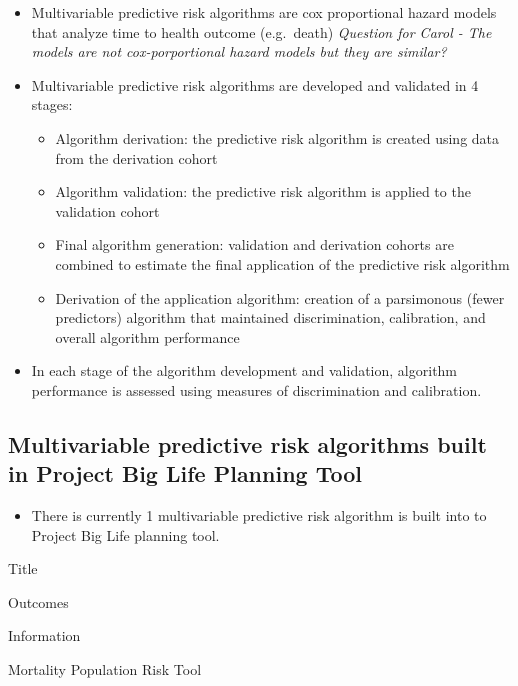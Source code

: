 \documentclass[]{book}
\providecommand{\tightlist}{%
  \setlength{\itemsep}{0pt}\setlength{\parskip}{0pt}}
\begin{document}
\begin{itemize}
\item
  Multivariable predictive risk algorithms are cox proportional hazard models that analyze time to health outcome (e.g.~death) \emph{Question for Carol - The models are not cox-porportional hazard models but they are similar?}
\item
  Multivariable predictive risk algorithms are developed and validated in 4 stages:

  \begin{itemize}
  \tightlist
  \item
    Algorithm derivation: the predictive risk algorithm is created using data from the derivation cohort
  \item
    Algorithm validation: the predictive risk algorithm is applied to the validation cohort
  \item
    Final algorithm generation: validation and derivation cohorts are combined to estimate the final application of the predictive risk algorithm
  \item
    Derivation of the application algorithm: creation of a parsimonous (fewer predictors) algorithm that maintained discrimination, calibration, and overall algorithm performance
  \end{itemize}
\item
  In each stage of the algorithm development and validation, algorithm performance is assessed using measures of discrimination and calibration.
\end{itemize}

\hypertarget{multivariable-predictive-risk-algorithms-built-in-project-big-life-planning-tool}{%
\subsection{Multivariable predictive risk algorithms built in Project Big Life Planning Tool}\label{multivariable-predictive-risk-algorithms-built-in-project-big-life-planning-tool}}

\begin{itemize}
\tightlist
\item
  There is currently 1 multivariable predictive risk algorithm is built into to Project Big Life planning tool.
\end{itemize}

Title

Outcomes

Information

Mortality Population Risk Tool
\end{document}
